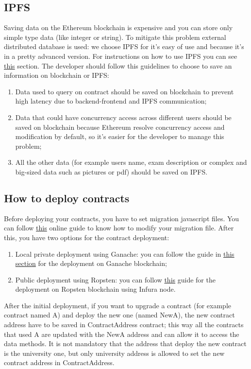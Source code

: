 \subsection{IPFS}
Saving data on the Ethereum blockchain is expensive and you can store only simple type data (like integer or string). To mitigate this problem external distributed database is used: we choose IPFS for it's easy of use and because it's in a pretty advanced version. 
For instructions on how to use IPFS you can see \hyperref[IPFS]{this} section. The developer should follow this guidelines to choose to save an information on blockchain or IPFS:
\begin{enumerate}
	\item Data used to query on contract should be saved on blockchain to prevent high latency due to backend-frontend and IPFS communication;
	\item Data that could have concurrency access across different users should be saved on blockchain because Ethereum resolve concurrency access and modification by default, so it's easier for the developer to manage this problem;
	\item All the other data (for example users name, exam description or complex and big-sized data such as pictures or pdf) should be saved on IPFS.
\end{enumerate}

\newpage
\subsection{How to deploy contracts}
Before deploying your contracts, you have to set migration javascript files. You can follow \href{http://truffleframework.com/docs/getting_started/migrations}{this} online guide to know how to modify your migration file.
After this, you have two options for the contract deployment:
\begin{enumerate}
	\item Local private deployment using Ganache: you can follow the guide in \hyperref[GanacheDeployment]{this section} for the deployment on Ganache blockchain;
	\item Public deployment using Ropsten: you can follow \href{http://truffleframework.com/tutorials/using-infura-custom-provider}{this} guide for the deployment on Ropsten blockchain using Infura node.
\end{enumerate}

After the initial deployment, if you want to upgrade a contract (for example contract named A) and deploy the new one (named NewA), the new contract address have to be saved in ContractAddress contract; this way all the contracts that used A are updated with the NewA address and can allow it to access the data methods.
It is not mandatory that the address that deploy the new contract is the university one, but only university address is allowed to set the new contract address in ContractAddress.